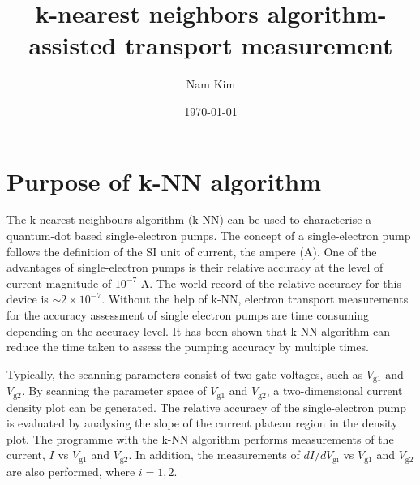 \documentclass[jkps,preprint,fleqn,showpacs,showkeys]{revtex4}
\begin{document}



\title[]{k-nearest neighbors algorithm-assisted transport measurement}
\author{Nam Kim}

\date{\today}

\maketitle


\section{Purpose of k-NN algorithm}

The k-nearest neighbours algorithm (k-NN) can be used to characterise a quantum-dot based single-electron pumps\cite{schoinas}.
The concept of a single-electron pump\cite{bae} follows the definition of the SI unit of current, the ampere (A)\cite{ampere}.  
One of the advantages of single-electron pumps is their relative accuracy at the level of current magnitude of $10^{-7}$ A. 
The world record of the relative accuracy for this device is $\sim 2\times 10^{-7}$\cite{stein}.
Without the help of k-NN, electron transport measurements for the accuracy assessment of single electron pumps are time consuming depending on the accuracy level.
It has been shown that k-NN algorithm can reduce the time taken to assess the pumping accuracy  by multiple times\cite{schoinas}. 

Typically, the scanning parameters consist of two gate voltages, such as $V_\text{g1}$ and $V_\text{g2}$.
By scanning the parameter space of $V_\text{g1}$ and $V_\text{g2}$, a two-dimensional current density plot can be generated.
The relative accuracy of the single-electron pump is evaluated by analysing the slope of the current plateau region in the density plot.
The programme with the k-NN algorithm performs measurements of the current, $I$ vs $V_\text{g1}$ and $V_\text{g2}$.
 In addition, the measurements of $dI/dV_\text{gi}$ vs $V_\text{g1}$ and $V_\text{g2}$ are also performed,
where $i=1,2$.
\end{document}
